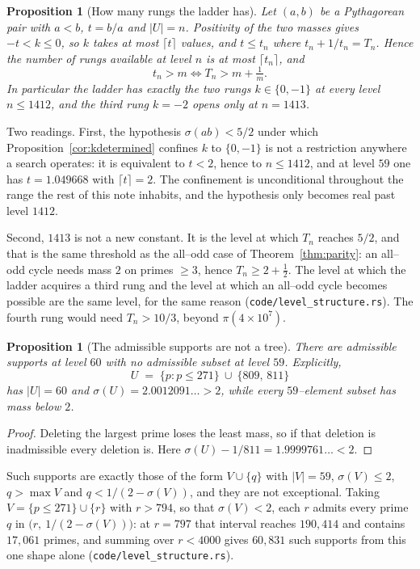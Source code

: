 \documentclass[11pt]{article}
\newtheorem{proposition}[theorem]{Proposition}
\theoremstyle{definition}
\begin{document}
\begin{proposition}[How many rungs the ladder has]\label{prop:rungcount}
Let $(a,b)$ be a Pythagorean pair with $a<b$, $t=b/a$ and $|U|=n$. Positivity of the two masses gives
$-t<k\le0$, so $k$ takes at most $\lceil t\rceil$ values, and $t\le t_n$ where $t_n+1/t_n=T_n$. Hence
the number of rungs available at level $n$ is at most $\lceil t_n\rceil$, and
\[ t_n>m\iff T_n>m+\tfrac1m . \]
In particular the ladder has exactly the two rungs $k\in\{0,-1\}$ at every level $n\le1412$, and the
third rung $k=-2$ opens only at $n=1413$.
\end{proposition}

Two readings. First, the hypothesis $\sigma(ab)<5/2$ under which
Proposition~\ref{cor:kdetermined} confines $k$ to $\{0,-1\}$ is not a restriction anywhere a search
operates: it is equivalent to $t<2$, hence to $n\le1412$, and at level $59$ one has $t=1.049668$ with
$\lceil t\rceil=2$. The confinement is unconditional throughout the range the rest of this note
inhabits, and the hypothesis only becomes real past level $1412$.

Second, $1413$ is not a new constant. It is the level at which $T_n$ reaches $5/2$, and that is the
same threshold as the all--odd case of Theorem~\ref{thm:parity}: an all--odd cycle needs mass $2$ on
primes $\ge3$, hence $T_n\ge2+\tfrac12$. The level at which the ladder acquires a third rung and the
level at which an all--odd cycle becomes possible are the same level, for the same reason
\textup{(\texttt{code/level\_structure.rs})}. The fourth rung would need $T_n>10/3$, beyond
$\pi(4\times10^{7})$.

\begin{proposition}[The admissible supports are not a tree]\label{prop:nottree}
There are admissible supports at level $60$ with no admissible subset at level $59$. Explicitly,
\[ U\;=\;\{p:p\le271\}\ \cup\ \{809,\,811\} \]
has $|U|=60$ and $\sigma(U)=2.0012091\ldots>2$, while every $59$--element subset has mass below $2$.
\end{proposition}
\begin{proof}
Deleting the largest prime loses the least mass, so if that deletion is inadmissible every deletion
is. Here $\sigma(U)-1/811=1.9999761\ldots<2$.
\end{proof}

Such supports are exactly those of the form $V\cup\{q\}$ with $|V|=59$, $\sigma(V)\le2$,
$q>\max V$ and $q<1/(2-\sigma(V))$, and they are not exceptional. Taking $V=\{p\le271\}\cup\{r\}$
with $r>794$, so that $\sigma(V)<2$, each $r$ admits every prime $q$ in
$\bigl(r,\ 1/(2-\sigma(V))\bigr)$: at $r=797$ that interval reaches $190{,}414$ and contains
$17{,}061$ primes, and summing over $r<4000$ gives $60{,}831$ such supports from this one shape alone
\textup{(\texttt{code/level\_structure.rs})}.
\end{document}
